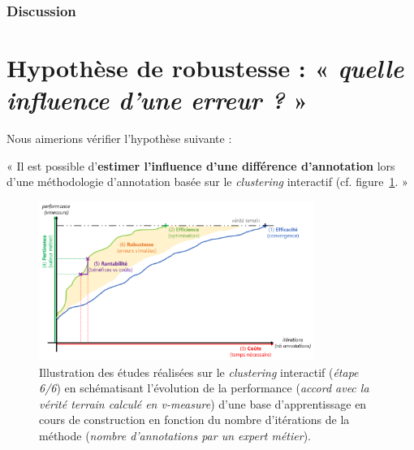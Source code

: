 			\subsubsection{Discussion}
	

    \section{Hypothèse de robustesse : « \textit{quelle influence d'une erreur ?} »}
	\label{section:4.6-HYPOTHESE-ROBUSTESSE}
	
		Nous aimerions vérifier l'hypothèse suivante :

		\begin{tcolorbox}[
			title=\textbf{Hypothèse de robustesse},
			colback=gray!20,
			colframe=gray!50!black!75,
			width=\linewidth
		]
			« Il est possible d'\textbf{estimer l'influence d'une différence d'annotation} lors d'une méthodologie d'annotation basée sur le \textit{clustering} interactif (cf. figure~\ref{figure:HYPOTHESE-ROBUSTESSE}. »
			
			
			\begin{figure}[H]
				\centering
				\includegraphics[width=0.8\textwidth]{figures/hypotheses-06-robustesse}
				\caption{Illustration des études réalisées sur le \textit{clustering} interactif (\textit{étape 6/6}) en schématisant l'évolution de la performance (\textit{accord avec la vérité terrain calculé en v-measure}) d'une base d'apprentissage en cours de construction en fonction du nombre d'itérations de la méthode (\textit{nombre d'annotations par un expert métier}).}
				\label{figure:HYPOTHESE-ROBUSTESSE}
			\end{figure}

		\end{tcolorbox}
		

